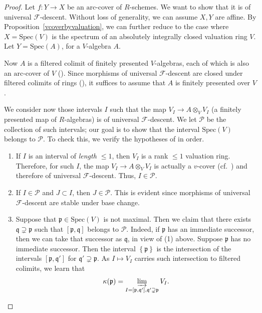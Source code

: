 \documentclass[reqno]{amsart}
\newcommand{\sF}{\mathcal{F}}
\newcommand{\spec}{\mathrm{Spec}}
\newcommand{\arc}{\mathrm{arc}}
\theoremstyle{definition}
\begin{document}
\begin{proof} 
Let $f\colon  Y \to X$ be an $\arc$-cover of $R$-schemes. We want to show that it is
of universal $\sF$-descent. Without loss of generality, we can assume $X, Y$ are
affine. 
By Proposition~\ref{vcoverbyvaluation}, we 
can further reduce to the case where $X = \spec(V)$ is the spectrum of an
absolutely integrally closed valuation ring $V$. Let $Y = \spec(A)$, for a
$V$-algebra $A$. 

Now $A$ is a filtered colimit of finitely presented $V$-algebras, each of
which is also an $\arc$-cover of $V$ (). Since morphisms of universal
$\sF$-descent are closed under filtered colimits of rings
(), it suffices to
assume that $A$ is finitely presented over $V$.  

We consider now those intervals $I$ such that the map $V_I \to A \otimes_{V}
V_I$ (a finitely presented map of $R$-algebras) is of universal 
$\sF$-descent. We let $\mathcal{P}$ be the collection of such intervals; our goal is to show that
the interval $\spec(V)$ belongs to $\mathcal{P}$. 
To check this, we verify the hypotheses of  in order. 

\begin{enumerate}
\item If $I$ is an interval of \emph{length $\leq 1$},  then
$V_I$ is a rank $\leq 1$ valuation ring. Therefore,  
for such $I$, the map $V_I \to A \otimes_V V_I$ is actually a $v$-cover 
(cf.~)
and
therefore of universal $\sF$-descent. 
Thus, $I \in \mathcal{P}$. 
\item  If $I \in \mathcal{P}$ and $J \subset I$, then $J \in \mathcal{P}$. This is evident since morphisms of universal $\sF$-descent are stable under
base change. 


\item
Suppose that $\mathfrak{p} \in \spec(V)$ is not maximal. Then we claim that there exists 
$\mathfrak{q} \supsetneq \mathfrak{p}$ such that $[\mathfrak{p}, \mathfrak{q}]$
belongs to $\mathcal{P}$. 
Indeed, if $\mathfrak{p}$ has an immediate successor, then we can take that
successor as $\mathfrak{q}$, in view of (1) above. 
Suppose $\mathfrak{p}$ has no immediate successor. 
Then the interval $\left\{\mathfrak{p}\right\}$ is the intersection of the
intervals $[\mathfrak{p}, \mathfrak{q}']$ for $\mathfrak{q}' \supsetneq
\mathfrak{p}$. 
As $I \mapsto V_I$ carries such intersection to filtered colimits, we learn that 
$$\kappa( \mathfrak{p}) = \varinjlim_{I = [\mathfrak{p}, \mathfrak{q}'],
\mathfrak{q}' \supsetneq \mathfrak{p}} V_I.$$ 


\end{enumerate}
\end{proof}
\end{document}
